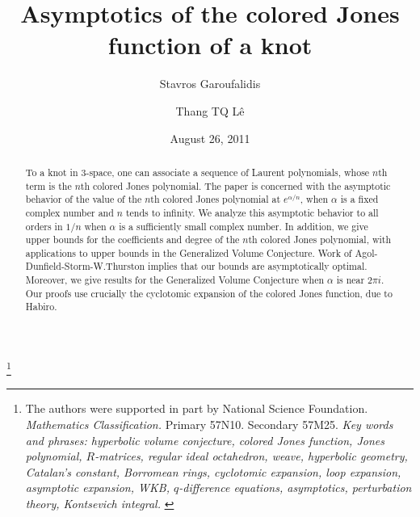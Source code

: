 \documentclass{amsart}
\theoremstyle{definition}
\def\a{\alpha}
\begin{document}

\title[Asymptotics of the colored Jones function of a knot]{
Asymptotics of the colored Jones function of a knot}

\author{Stavros Garoufalidis}
\address{School of Mathematics \\
         Georgia Institute of Technology \\
         Atlanta, GA 30332-0160, USA \newline
         {\tt \url{http://www.math.gatech.edu/~stavros}}}
\author{Thang TQ L\^e}
\address{School of Mathematics \\
         Georgia Institute of Technology \\
         Atlanta, GA 30332-0160, USA \newline
         {\tt \url{http://www.math.gatech.edu/~stavros}}}


\thanks{The authors were supported in part by National Science Foundation. \\
 {\em Mathematics Classification.} Primary 57N10. Secondary 57M25.
\newline
{\em Key words and phrases: hyperbolic volume conjecture, colored Jones
function, Jones polynomial, $R$-matrices, regular ideal octahedron, weave,
hyperbolic geometry, Catalan's constant, Borromean rings,
cyclotomic expansion, loop expansion, asymptotic expansion,
WKB, $q$-difference equations, asymptotics, perturbation theory,
Kontsevich integral.
}
}

\date{August 26, 2011}



\begin{abstract}
To a knot in 3-space, one can associate a sequence of Laurent polynomials,
whose $n$th term is the $n$th colored Jones polynomial. The paper is concerned
with the asymptotic behavior of the value of the $n$th colored Jones polynomial
at $e^{\a/n}$, when $\a$ is a fixed complex number and $n$ tends to infinity.
We analyze this asymptotic behavior to all orders in $1/n$ when $\a$ is a
sufficiently small complex number.
In addition, we give upper bounds for the coefficients and degree of the
$n$th colored Jones polynomial, with applications to upper bounds in the
Generalized Volume Conjecture. Work of Agol-Dunfield-Storm-W.Thurston implies
that our bounds are asymptotically optimal. Moreover, we give results for
the Generalized Volume Conjecture when $\a$ is near $2 \pi i$. Our proofs use
crucially the cyclotomic expansion of the colored Jones function, due to
Habiro.
\end{abstract}
\end{document}
